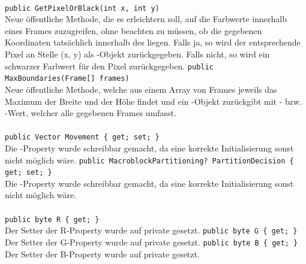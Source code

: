 \paragraph{}
\begin{itemize}
	\add \verb!public GetPixelOrBlack(int x, int y)! \\
	Neue öffentliche Methode, die es erleichtern soll, auf die Farbwerte innerhalb eines Frames zuzugreifen, ohne beachten zu müssen, ob die gegebenen Koordinaten tatsächlich innerhalb des  liegen. Falls ja, so wird der entsprechende Pixel an Stelle (x, y) als -Objekt zurückgegeben. Falls nicht, so wird ein schwarzer Farbwert für den Pixel zurückgegeben.
	\add \verb!public MaxBoundaries(Frame[] frames)! \\
	Neue öffentliche Methode, welche aus einem Array von Frames jeweils das Maximum der Breite und der Höhe findet und ein -Objekt zurückgibt mit - bzw. -Wert, welcher alle gegebenen Frames umfasst.
\end{itemize}

\paragraph{}
\begin{itemize}
	\change \verb!public Vector Movement { get; set; }! \\
	Die -Property wurde schreibbar gemacht, da eine korrekte Initialisierung sonst nicht möglich wäre.
	\change \verb!public MacroblockPartitioning? PartitionDecision { get; set; }! \\
	Die -Property wurde schreibbar gemacht, da eine korrekte Initialisierung sonst nicht möglich wäre.
\end{itemize}

\paragraph{}
\begin{itemize}
	\change \verb!public byte R { get; }! \\
	Der Setter der R-Property wurde auf private gesetzt.
	\change \verb!public byte G { get; }! \\
	Der Setter der G-Property wurde auf private gesetzt.
	\change \verb!public byte B { get; }! \\
	Der Setter der B-Property wurde auf private gesetzt.
\end{itemize}

